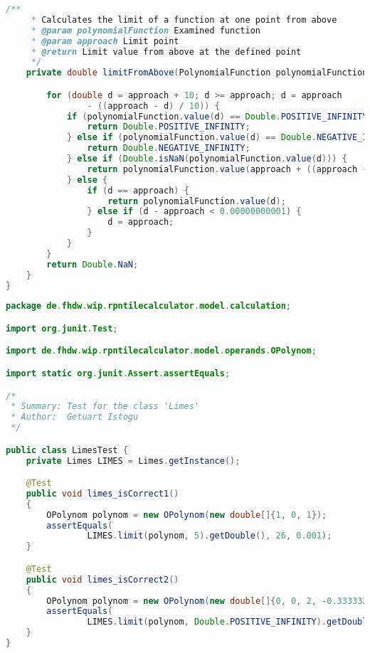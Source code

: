 \begin{lstlisting}[caption=Limes (Istogu),label=list:Limes,language=Java]
    /**
     * Calculates the limit of a function at one point from above
     * @param polynomialFunction Examined function
     * @param approach Limit point
     * @return Limit value from above at the defined point
     */
    private double limitFromAbove(PolynomialFunction polynomialFunction, double approach) {

        for (double d = approach + 10; d >= approach; d = approach
                - ((approach - d) / 10)) {
            if (polynomialFunction.value(d) == Double.POSITIVE_INFINITY) {
                return Double.POSITIVE_INFINITY;
            } else if (polynomialFunction.value(d) == Double.NEGATIVE_INFINITY) {
                return Double.NEGATIVE_INFINITY;
            } else if (Double.isNaN(polynomialFunction.value(d))) {
                return polynomialFunction.value(approach + ((approach - d) * 10));
            } else {
                if (d == approach) {
                    return polynomialFunction.value(d);
                } else if (d - approach < 0.00000000001) {
                    d = approach;
                }
            }
        }
        return Double.NaN;
    }
}
\end{lstlisting}    

\begin{lstlisting}[caption=LimesTest (Istogu),label=list:LimesTest,language=Java]
package de.fhdw.wip.rpntilecalculator.model.calculation;

import org.junit.Test;

import de.fhdw.wip.rpntilecalculator.model.operands.OPolynom;

import static org.junit.Assert.assertEquals;

/*
 * Summary: Test for the class 'Limes'
 * Author:  Getuart Istogu
 */

public class LimesTest {
    private Limes LIMES = Limes.getInstance();

    @Test
    public void limes_isCorrect1()
    {
        OPolynom polynom = new OPolynom(new double[]{1, 0, 1});
        assertEquals(
                LIMES.limit(polynom, 5).getDouble(), 26, 0.001);
    }

    @Test
    public void limes_isCorrect2()
    {
        OPolynom polynom = new OPolynom(new double[]{0, 0, 2, -0.333333333  });
        assertEquals(
                LIMES.limit(polynom, Double.POSITIVE_INFINITY).getDouble(), Double.NEGATIVE_INFINITY, 0.001);
    }
}
\end{lstlisting}    

